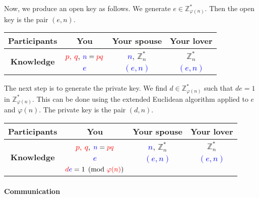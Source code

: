 Now, we produce an open key as follows. We generate $e\in \mathbb Z_{\varphi(n)}^*$. Then the open key is the pair $(e, n)$.
\begin{center}
\begin{tabular}{|c|c|c|c|}
\hline
{\bf Participants}&{You}&{Your spouse}&{Your lover}\\
\hline
\multirow{2}{*}{\bf Knowledge}&{\textcolor{red}{$p$, $q$}, $\textcolor{blue}{n} = \textcolor{red}{pq}$}&{\textcolor{blue}{$n$}, $\mathbb Z_n^*$}&{$\mathbb Z_n^*$}\\
{}&{\textcolor{blue}{$e$}}&{\textcolor{blue}{$(e, n)$}}&{\textcolor{blue}{$(e, n)$}}\\
\hline
\end{tabular}
\end{center}

The next step is to generate the private key. We find $d\in \mathbb Z_{\varphi(n)}^*$ such that $de = 1$ in $\mathbb Z_{\varphi(n)}^*$. This can be done using the extended Euclidean algorithm applied to $e$ and $\varphi(n)$. The private key is the pair $(d, n)$.
\begin{center}
\begin{tabular}{|c|c|c|c|}
\hline
{\bf Participants}&{You}&{Your spouse}&{Your lover}\\
\hline
\multirow{3}{*}{\bf Knowledge}&{\textcolor{red}{$p$, $q$}, $\textcolor{blue}{n} = \textcolor{red}{pq}$}&{\textcolor{blue}{$n$}, $\mathbb Z_n^*$}&{$\mathbb Z_n^*$}\\
{}&{\textcolor{blue}{$e$}}&{\textcolor{blue}{$(e, n)$}}&{\textcolor{blue}{$(e, n)$}}\\
{}&{$\textcolor{red}{d}\textcolor{blue}{e} = 1 \pmod{ \textcolor{red}{\varphi(n)}}$}&{}&{}\\
\hline
\end{tabular}
\end{center}


\paragraph{Communication}

